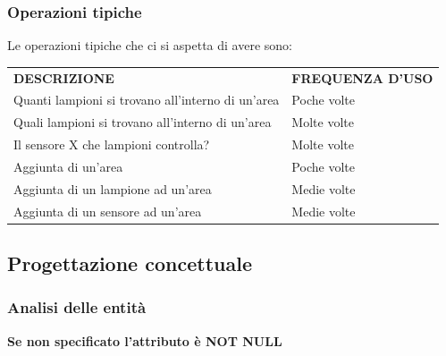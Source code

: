 \subsubsection{Operazioni tipiche}

Le operazioni tipiche che ci si aspetta di avere sono:

\begin{center}
    \begin{tabularx}{\textwidth}{|l|X|}
        \hline
        \rowcolor{gray!30}
        \multicolumn{2}{|c|}{\textbf{OPERAZIONI TIPICHE}}
        \\
        \hline
        \rowcolor{gray!30}
        \textbf{{DESCRIZIONE}} & \textbf{{FREQUENZA D'USO}} \\
        \hline
        Quanti lampioni si trovano all'interno di un'area & Poche volte \\
        \hline
        Quali lampioni si trovano all'interno di un'area & Molte volte\\
        \hline
        Il sensore X che lampioni controlla? & Molte volte \\
        \hline
        Aggiunta di un'area & Poche volte\\
        \hline
        Aggiunta di un lampione ad un'area & Medie volte \\
        \hline
        Aggiunta di un sensore ad un'area & Medie volte\\
        \hline
    \end{tabularx}
\end{center}

\subsection{Progettazione concettuale}

\subsubsection{Analisi delle entità}

\textbf{Se non specificato l'attributo è NOT NULL}

